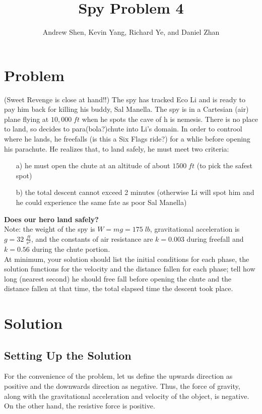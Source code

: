 \documentclass{article}
\title{Spy Problem 4}
\author{Andrew Shen, Kevin Yang, Richard Ye, and Daniel Zhan}
\begin{document}
	\maketitle
	\section{Problem}
	(Sweet Revenge is close at hand!!) The spy has tracked Eco Li and is ready to pay him back for killing his buddy, Sal Manella. The spy is in a Cartesian (air) plane flying at $10,000\;ft$ when he spots the cave of h is nemesis. There is no place to land, so decides to para(bola?)chute into Li's domain. In order to controol where he lands, he freefalls (is this a Six Flags ride?) for a whlie before opening his parachute. He realizes that, to land safely, he must meet two criteria:
	\begin{enumerate}
		\item[a)] he must open the chute at an altitude of about $1500\;ft$ (to pick the safest spot)
		\item[b)]the total descent cannot exceed 2 minutes (otherwise Li will spot him and he could experience the same fate as poor Sal Manella)
	\end{enumerate}
	\textbf{Does our hero land safely?}
	\\
	Note: the weight of the spy is $W = mg= 175\;lb$, gravitational acceleration is $g=32\;\frac{ft}{s^2}$, and the constants of air resistance are $k=0.003$ during freefall and $k=0.56$ during the chute portion.\\
	At minimum, your solution should list the initial conditions for each phase, the solution functions for the velocity and the distance fallen for each phase; tell how long (nearest second) he should free fall before opening the chute and the distance fallen at that time, the total elapsed time the descent took place.
	\section{Solution}
	\subsection{Setting Up the Solution}
	For the convenience of the problem, let us define the upwards direction as positive and the downwards direction as negative. Thus, the force of gravity, along with the gravitational acceleration and velocity of the object, is negative. On the other hand, the resistive force is positive.
\end{document}

